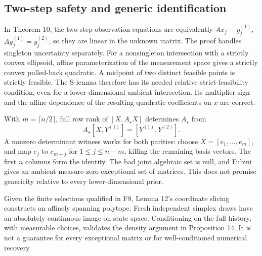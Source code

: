 \documentclass[10pt]{article}
\begin{document}
\subsection*{Two-step safety and generic identification}
In Theorem 10, the two-step observation equations are equivalently \(Ax_j=y_j^{(1)}\), \(Ay_j^{(1)}=y_j^{(2)}\), so they are linear in the unknown matrix. The proof handles singleton uncertainty separately. For a nonsingleton intersection with a strictly convex ellipsoid, affine parameterization of the measurement space gives a strictly convex pulled-back quadratic. A midpoint of two distinct feasible points is strictly feasible. The S-lemma therefore has its needed relative strict-feasibility condition, even for a lower-dimensional ambient intersection. Its multiplier sign and the affine dependence of the resulting quadratic coefficients on \(x\) are correct.\par
With \(m=\lceil n/2\rceil\), full row rank of \([X,A_\star X]\) determines \(A_\star\) from \[A_\star[X,Y^{(1)}]=[Y^{(1)},Y^{(2)}].\] A nonzero determinant witness works for both parities: choose \(X=[e_1,\ldots,e_m]\), and map \(e_j\) to \(e_{m+j}\) for \(1\le j\le n-m\), killing the remaining basis vectors. The first \(n\) columns form the identity. The bad joint algebraic set is null, and Fubini gives an ambient measure-zero exceptional set of matrices. This does not promise genericity relative to every lower-dimensional prior.\par
Given the finite selections qualified in F8, Lemma 12’s coordinate slicing constructs an affinely spanning polytope. Fresh independent simplex draws have an absolutely continuous image on state space. Conditioning on the full history, with measurable choices, validates the density argument in Proposition 14. It is not a guarantee for every exceptional matrix or for well-conditioned numerical recovery.\par
\end{document}
